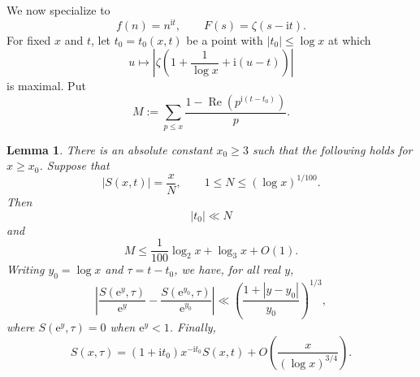 \documentclass[12pt,reqno]{amsart}
\newtheorem{lemma}[theorem]{Lemma}
\theoremstyle{remark}
\numberwithin{equation}{section}
\newcommand{\Ree}{\operatorname{Re}}
\newcommand{\e}{\mathrm e}
\newcommand{\ii}{\mathrm i}
\newcommand{\logtwo}{\log_2}
\newcommand{\logthree}{\log_3}
\begin{document}
We now specialize to
\[
f(n)=n^{\ii t},
\qquad
F(s)=\zeta(s-\ii t).
\]
For fixed $x$ and $t$, let $t_0=t_0(x,t)$ be a point with $|t_0|\le\log x$ at which
\begin{equation}\label{eq:t0-definition}
u\longmapsto
\left|\zeta\left(1+\frac1{\log x}+\ii(u-t)\right)\right|
\end{equation}
is maximal.  Put
\begin{equation}\label{eq:def-M}
M:=\sum_{p\le x}\frac{1-\Ree(p^{\ii(t-t_0)})}{p}.
\end{equation}

\begin{lemma}\label{lem:t0}
There is an absolute constant $x_0\ge3$ such that the following holds for $x\ge x_0$.  Suppose that
\[
|S(x,t)|=\frac{x}{N},
\qquad
1\le N\le(\log x)^{1/100}.
\]
Then
\begin{equation}\label{eq:t0-bound}
|t_0|\ll N
\end{equation}
and
\begin{equation}\label{eq:M-bound}
M\le \frac1{100}\logtwo x+\logthree x+O(1).
\end{equation}
Writing $y_0=\log x$ and $\tau=t-t_0$, we have, for all real $y$,
\begin{equation}\label{eq:lipschitz-y}
\left|
\frac{S(\e^y,\tau)}{\e^y}
-
\frac{S(\e^{y_0},\tau)}{\e^{y_0}}
\right|
\ll
\left(\frac{1+|y-y_0|}{y_0}\right)^{1/3},
\end{equation}
where $S(\e^y,\tau)=0$ when $\e^y<1$.  Finally,
\begin{equation}\label{eq:twisted-relation}
S(x,\tau)
=(1+\ii t_0)x^{-\ii t_0}S(x,t)
+O\!\left(\frac{x}{(\log x)^{3/4}}\right).
\end{equation}
\end{lemma}
\end{document}
